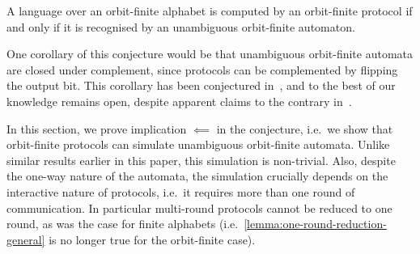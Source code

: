 \begin{conjecture}
    \label{conj:protocols-unambiguous} A language over an orbit-finite alphabet is computed by an orbit-finite protocol if and only if it is recognised by an unambiguous orbit-finite automaton.
\end{conjecture}

One corollary of this conjecture would be that unambiguous orbit-finite automata are closed under complement, since protocols can be complemented by flipping the output bit. This corollary has been conjectured in~\cite[p.9]{colcombet2012forms}, and to the best of our knowledge remains open, despite apparent claims to the contrary in~\cite[Footnote 5]{colcombet2015unambiguity}.

In this section, we prove implication $\impliedby$ in the conjecture, i.e.~we show that orbit-finite protocols can simulate  unambiguous orbit-finite automata. Unlike similar results earlier in this paper, this simulation is non-trivial. Also, despite the one-way nature of the automata, the simulation crucially depends on the interactive nature of protocols, i.e.~it requires more than one round of communication. In particular multi-round protocols cannot be reduced to one round, as was the case for finite alphabets
(i.e.~\cref{lemma:one-round-reduction-general} is no longer true for the orbit-finite case).

